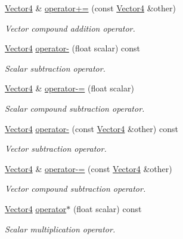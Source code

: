 \begin{DoxyCompactItemize}
\hyperlink{classchaos_1_1gfx_1_1_vector4}{Vector4} \& \hyperlink{classchaos_1_1gfx_1_1_vector4_afda4d8356ac748b55f100ca9598fa6ab}{operator+=} (const \hyperlink{classchaos_1_1gfx_1_1_vector4}{Vector4} \&other)
\begin{DoxyCompactList}\small\item\em Vector compound addition operator. \end{DoxyCompactList}\item 
\hyperlink{classchaos_1_1gfx_1_1_vector4}{Vector4} \hyperlink{classchaos_1_1gfx_1_1_vector4_af4f001e9cb65320da1831cebcab8d859}{operator-\/} (float scalar) const 
\begin{DoxyCompactList}\small\item\em Scalar subtraction operator. \end{DoxyCompactList}\item 
\hyperlink{classchaos_1_1gfx_1_1_vector4}{Vector4} \& \hyperlink{classchaos_1_1gfx_1_1_vector4_a0d6a6c74179d2b8963b6c1bedd83bf5e}{operator-\/=} (float scalar)
\begin{DoxyCompactList}\small\item\em Scalar compound subtraction operator. \end{DoxyCompactList}\item 
\hyperlink{classchaos_1_1gfx_1_1_vector4}{Vector4} \hyperlink{classchaos_1_1gfx_1_1_vector4_af923be6632e670c30a3e86683b47d903}{operator-\/} (const \hyperlink{classchaos_1_1gfx_1_1_vector4}{Vector4} \&other) const 
\begin{DoxyCompactList}\small\item\em Vector subtraction operator. \end{DoxyCompactList}\item 
\hyperlink{classchaos_1_1gfx_1_1_vector4}{Vector4} \& \hyperlink{classchaos_1_1gfx_1_1_vector4_aba6caefa7d369b2019347462999802ea}{operator-\/=} (const \hyperlink{classchaos_1_1gfx_1_1_vector4}{Vector4} \&other)
\begin{DoxyCompactList}\small\item\em Vector compound subtraction operator. \end{DoxyCompactList}\item 
\hyperlink{classchaos_1_1gfx_1_1_vector4}{Vector4} \hyperlink{classchaos_1_1gfx_1_1_vector4_afee77ed144ba58fae3877ddbebcd75d3}{operator$\ast$} (float scalar) const 
\begin{DoxyCompactList}\small\item\em Scalar multiplication operator. \end{DoxyCompactList}\item 

\end{DoxyCompactItemize}
